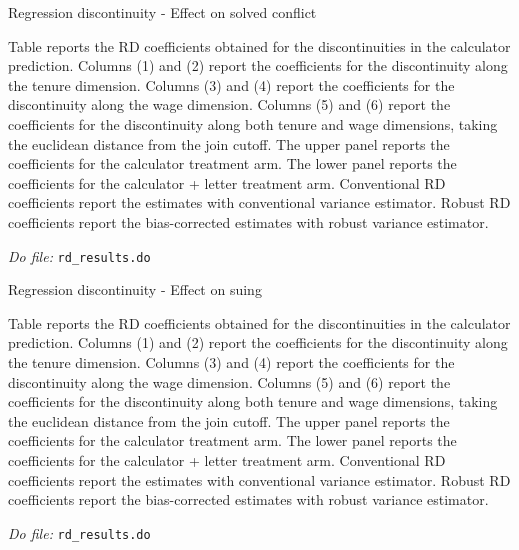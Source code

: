 \documentclass[oneside,11pt]{article}
\begin{document}
\clearpage

\begin{landscape}
\begin{table}[H]
\caption{Regression discontinuity - Effect on solved conflict}
\label{rd_sett}
\begin{center}
\scriptsize{}
\end{center}
\scriptsize{
Table reports the RD coefficients obtained for the discontinuities in the calculator prediction. Columns (1) and (2) report the coefficients for the discontinuity along the tenure dimension. Columns (3) and (4) report the coefficients for the discontinuity along the wage dimension. Columns (5) and (6) report the coefficients for the discontinuity along both tenure and wage dimensions, taking the euclidean distance from the join cutoff. The upper panel reports the coefficients for the calculator treatment arm. The lower panel reports the coefficients for the calculator + letter treatment arm. Conventional RD coefficients report the estimates with conventional variance estimator. Robust RD coefficients report the bias-corrected estimates with robust variance estimator.}

 \scriptsize 
\textit{Do file: } \texttt{rd\_results.do}
\end{table}
\end{landscape}

\clearpage

\begin{landscape}
\begin{table}[H]
\caption{Regression discontinuity - Effect on suing}
\label{rd_sued}
\begin{center}
\scriptsize{}
\end{center}
\scriptsize{
Table reports the RD coefficients obtained for the discontinuities in the calculator prediction. Columns (1) and (2) report the coefficients for the discontinuity along the tenure dimension. Columns (3) and (4) report the coefficients for the discontinuity along the wage dimension. Columns (5) and (6) report the coefficients for the discontinuity along both tenure and wage dimensions, taking the euclidean distance from the join cutoff. The upper panel reports the coefficients for the calculator treatment arm. The lower panel reports the coefficients for the calculator + letter treatment arm. Conventional RD coefficients report the estimates with conventional variance estimator. Robust RD coefficients report the bias-corrected estimates with robust variance estimator.}

 \scriptsize 
\textit{Do file: } \texttt{rd\_results.do}
\end{table}
\end{landscape}
\end{document}
